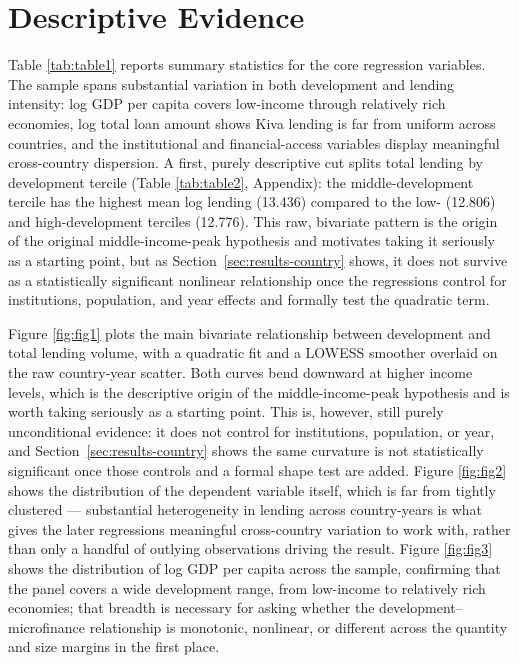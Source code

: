 \documentclass[12pt]{article}
\begin{document}
\section{Descriptive Evidence}
\label{sec:descriptive}

Table \ref{tab:table1} reports summary statistics for the core regression variables. The sample spans
substantial variation in both development and lending intensity: log GDP per capita covers low-income
through relatively rich economies, log total loan amount shows Kiva lending is far from uniform across
countries, and the institutional and financial-access variables display meaningful cross-country
dispersion. A first, purely descriptive cut splits total lending by development tercile (Table
\ref{tab:table2}, Appendix): the middle-development tercile has the highest mean log lending (13.436)
compared to the low- (12.806) and high-development terciles (12.776). This raw, bivariate pattern is
the origin of the original middle-income-peak hypothesis and motivates taking it seriously as a
starting point, but as Section~\ref{sec:results-country} shows, it does not survive as a statistically
significant nonlinear relationship once the regressions control for institutions, population, and year
effects and formally test the quadratic term.

Figure \ref{fig:fig1} plots the main bivariate relationship between development and total lending
volume, with a quadratic fit and a LOWESS smoother overlaid on the raw country-year scatter. Both
curves bend downward at higher income levels, which is the descriptive origin of the middle-income-peak
hypothesis and is worth taking seriously as a starting point. This is, however, still purely
unconditional evidence: it does not control for institutions, population, or year, and
Section~\ref{sec:results-country} shows the same curvature is not statistically significant once those
controls and a formal shape test are added. Figure \ref{fig:fig2} shows the distribution of the
dependent variable itself, which is far from tightly clustered --- substantial heterogeneity in lending
across country-years is what gives the later regressions meaningful cross-country variation to work
with, rather than only a handful of outlying observations driving the result. Figure \ref{fig:fig3}
shows the distribution of log GDP per capita across the sample, confirming that the panel covers a wide
development range, from low-income to relatively rich economies; that breadth is necessary for asking
whether the development--microfinance relationship is monotonic, nonlinear, or different across the
quantity and size margins in the first place.
\end{document}
